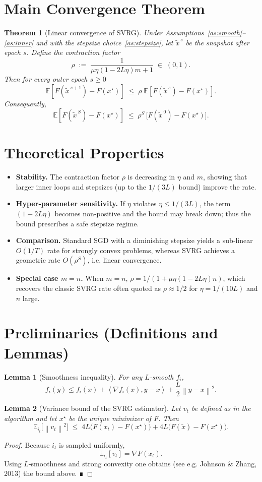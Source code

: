 \documentclass{article}
\newtheorem{theorem}{Theorem}
\newtheorem{lemma}{Lemma}
\newcommand{\E}{\mathbb{E}}
\newcommand{\norm}[1]{\left\|#1\right\|}
\newcommand{\inner}[2]{\left\langle #1,#2\right\rangle}
\begin{document}
\section*{Main Convergence Theorem}
\begin{theorem}[Linear convergence of SVRG]\label{thm:linear}
Under Assumptions~\ref{as:smooth}--\ref{as:inner} and with the stepsize choice~\ref{as:stepsize}, let $\tilde{x}^{\,s}$ be the snapshot after epoch $s$. Define the contraction factor
\[
\rho \;:=\; \frac{1}{\mu\eta(1-2L\eta)m+1}\;\in\;(0,1).
\]
Then for every outer epoch $s\ge0$
\[
\E\!\left[F(\tilde{x}^{\,s+1})-F(x^\star)\right]\;\le\;\rho\;\E\!\left[F(\tilde{x}^{\,s})-F(x^\star)\right].
\]
Consequently,
\[
\E\!\left[F(\tilde{x}^{\,S})-F(x^\star)\right]\;\le\;\rho^{S}\,\bigl[F(\tilde{x}^{\,0})-F(x^\star)\bigr].
\]
\end{theorem}

\section*{Theoretical Properties}
\begin{itemize}
\item \textbf{Stability.} The contraction factor $\rho$ is decreasing in $\eta$ and $m$, showing that larger inner loops and stepsizes (up to the $1/(3L)$ bound) improve the rate.
\item \textbf{Hyper‑parameter sensitivity.} If $\eta$ violates $\eta\le 1/(3L)$, the term $(1-2L\eta)$ becomes non‑positive and the bound may break down; thus the bound prescribes a safe stepsize regime.
\item \textbf{Comparison.} Standard SGD with a diminishing stepsize yields a sub‑linear $O(1/T)$ rate for strongly convex problems, whereas SVRG achieves a geometric rate $O(\rho^{S})$, i.e. linear convergence.
\item \textbf{Special case $m=n$.} When $m=n$, $\rho = 1/(1+\mu\eta(1-2L\eta)n)$, which recovers the classic SVRG rate often quoted as $\rho\approx 1/2$ for $\eta=1/(10L)$ and $n$ large.
\end{itemize}

\section*{Preliminaries (Definitions and Lemmas)}
\begin{lemma}[Smoothness inequality]\label{lem:smooth}
For any $L$‑smooth $f_i$,
\[
f_i(y)\le f_i(x)+\inner{\nabla f_i(x)}{y-x}+\frac{L}{2}\norm{y-x}^2 .
\]
\end{lemma}
\begin{lemma}[Variance bound of the SVRG estimator]\label{lem:var}
Let $v_t$ be defined as in the algorithm and let $x^\star$ be the unique minimizer of $F$. Then
\[
\E_{i_t}\!\bigl[\norm{v_t}^2\bigr]\;\le\; 4L\bigl(F(x_t)-F(x^\star)\bigr)+4L\bigl(F(\tilde{x})-F(x^\star)\bigr).
\]
\end{lemma}
\begin{proof}
Because $i_t$ is sampled uniformly,
\[
\E_{i_t}[v_t]=\nabla F(x_t) .
\]
Using $L$‑smoothness and strong convexity one obtains (see e.g. Johnson \& Zhang, 2013) the bound above. ∎
\end{proof}
\end{document}

